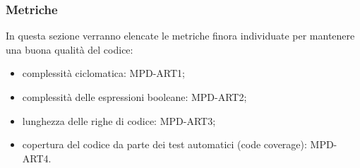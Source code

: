 \subsubsection{Metriche}
In questa sezione verranno elencate le metriche finora individuate per mantenere una buona qualità del codice:
\begin{itemize}
  \item complessità ciclomatica: MPD-ART1;
  \item complessità delle espressioni booleane: MPD-ART2;
  \item lunghezza delle righe di codice: MPD-ART3;
  \item copertura del codice da parte dei test automatici (code coverage): MPD-ART4.
\end{itemize}











